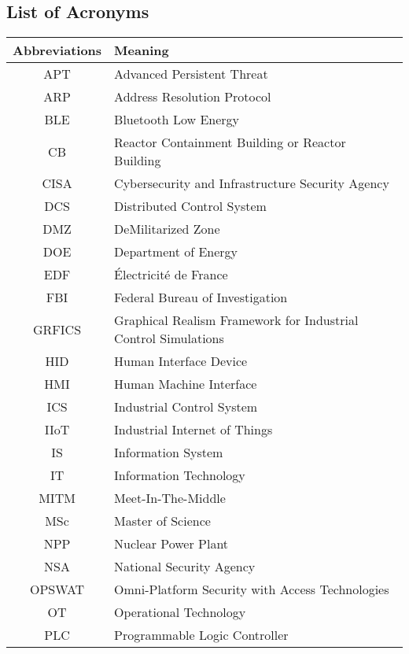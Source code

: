 \begin{notation}
\section*{List of Acronyms}
\vspace{0.5cm}
\begin{center}
    \begin{tabular}{c@{\hskip 1in}l} 
        \hline
        Abbreviations & Meaning \\
        \hline
        APT & Advanced Persistent Threat \\
        ARP & Address Resolution Protocol \\
        BLE & Bluetooth Low Energy \\
        CB & Reactor Containment Building or Reactor Building \\
        CISA & Cybersecurity and Infrastructure Security Agency \\
        DCS & Distributed Control System \\
        DMZ & DeMilitarized Zone  \\
        DOE & Department of Energy \\
        EDF & Électricité de France \\
        FBI & Federal Bureau of Investigation \\
        GRFICS & Graphical Realism Framework for Industrial Control Simulations \\
        HID & Human Interface Device \\
        HMI & Human Machine Interface \\
        ICS & Industrial Control System \\
        IIoT & Industrial Internet of Things \\
        IS & Information System \\
        IT & Information Technology \\
        MITM & Meet-In-The-Middle \\
        MSc & Master of Science \\
        NPP & Nuclear Power Plant \\
        NSA & National Security Agency \\
        OPSWAT & Omni-Platform Security with Access Technologies \\
        OT & Operational Technology \\
        PLC & Programmable Logic Controller \\

\end{tabular}
\end{center}
\end{notation}

